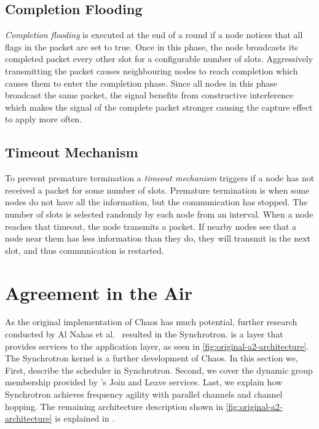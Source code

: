 \subsection{Completion Flooding}
\emph{Completion flooding} is executed at the end of a round if a node notices that all flags in the packet are set to true. Once in this phase, the node broadcasts its completed packet every other slot for a configurable number of slots. Aggressively transmitting the packet causes neighbouring nodes to reach completion which causes them to enter the completion phase. Since all nodes in this phase broadcast the same packet, the signal benefits from constructive interference which makes the signal of the complete packet stronger causing the capture effect to apply more often.

\subsection{Timeout Mechanism}
To prevent premature termination a \textit{timeout mechanism} triggers if a node has not received a packet for some number of slots. Premature termination is when some nodes do not have all the information, but the communication has stopped. The number of slots is selected randomly by each node from an interval. When a node reaches that timeout, the node transmits a packet. If nearby nodes see that a node near them has less information than they do, they will transmit in the next slot, and thus communication is restarted.

\section{Agreement in the Air}
\label{sec:chaos-a2-background}
As the original implementation of Chaos has much potential, further research conducted by Al Nahas et al.~\cite{a2-introduction-paper} resulted in the \atwo{} Synchrotron. \atwo{} is a layer that provides services to the application layer, as seen in \cref{fig:original-a2-architecture}. The Synchrotron kernel is a further development of Chaos. In this section we, First, describe the scheduler in Synchrotron. Second, we cover the dynamic group membership provided by \atwo{}'s Join and Leave services. Last, we explain how Synchrotron achieves frequency agility with parallel channels and channel hopping. The remaining architecture description shown in \cref{fig:original-a2-architecture} is explained in \cite{a2-introduction-paper}.

